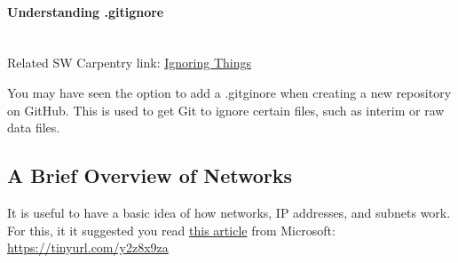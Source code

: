 \paragraph{Understanding .gitignore}\mbox{}\\
Related SW Carpentry link: \href{https://swcarpentry.github.io/git-novice/06-ignore/index.html}{Ignoring Things}

You may have seen the option to add a .gitginore when creating a new repository on GitHub. This is used to get Git to ignore certain files, such as interim or raw data files. 


\subsection{A Brief Overview of Networks}
\label{app:UnderstandingNetworks}
It is useful to have a basic idea of how networks, IP addresses, and subnets work. For this, it it suggested you read \href{https://support.microsoft.com/en-za/help/164015/understanding-tcp-ip-addressing-and-subnetting-basics}{this article} from Microsoft: \href{https://tinyurl.com/y2z8x9za}{https://tinyurl.com/y2z8x9za}